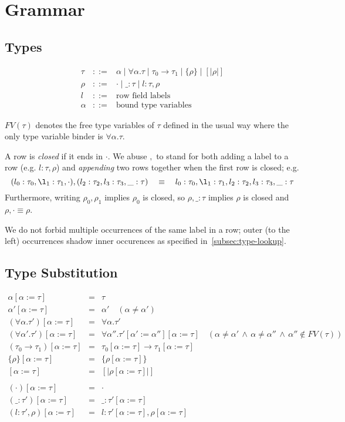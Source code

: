 \documentclass{article}
\newcommand{\define}{::=}
\newcommand{\variant}[1]{[\!|#1|\!]}
\begin{document}
\section{Grammar}

\subsection{Types}
\[\begin{array}{rcl}
\tau & \define & \alpha \mid \forall \alpha. \tau \mid \tau_0 \to \tau_1 \mid \{\rho\} \mid \variant{\rho}
\\
\rho & \define & \cdot \mid \_ : \tau \mid l : \tau, \rho
\\
l & \define & \text{row field labels}
\\
\alpha & \define & \text{bound type variables}
\end{array}
\]

$FV(\tau)$ denotes the free type variables of $\tau$ defined in the
usual way where the only type variable binder is $\forall\alpha.\tau$.

A row is {\it closed} if it ends in $\cdot$. We abuse $,$ to stand
for both adding a label to a row (e.g. $l:\tau,\rho$) and {\it appending}
two rows together when the first row is closed; e.g.
\[
(l_0:\tau_0,\l_1:\tau_1,\cdot),(l_2:\tau_2,l_3:\tau_3,\_:\tau)
\quad
\equiv
\quad
l_0:\tau_0,\l_1:\tau_1,l_2:\tau_2,l_3:\tau_3,\_:\tau
\]
Furthermore, writing $\rho_0,\rho_1$ implies $\rho_0$ is closed,
so $\rho,\_:\tau$ implies $\rho$ is closed and $\rho,\cdot
\equiv \rho$.

We do not forbid multiple occurrences of the same label in a row;
outer (to the left) occurrences shadow inner occurences as specified
in~\ref{subsec:type-lookup}.

\subsection{Type Substitution}
\[
\begin{array}{rcl}
  \alpha[\alpha := \tau] & = & \tau \\
  \alpha'[\alpha := \tau] & = & \alpha' \quad(\alpha \neq \alpha') \\
  (\forall \alpha. \tau')[\alpha := \tau] & = & \forall\alpha.\tau'\\
  (\forall \alpha'. \tau')[\alpha := \tau] & = & \forall \alpha'' . \tau'[\alpha' := \alpha''][\alpha := \tau] \quad (\alpha \neq \alpha' \,\wedge\, \alpha\neq\alpha'' \,\wedge\, \alpha'' \not\in FV(\tau))\\
  (\tau_0 \to \tau_1)[\alpha := \tau] & = & \tau_0[\alpha:=\tau]\to\tau_1[\alpha:=\tau]\\
  \{\rho\}[\alpha := \tau] & = & \{\rho[\alpha:=\tau]\}\\
  \variant{\rho}[\alpha := \tau] & = & \variant{\rho[\alpha:=\tau]} \\
  \\
  (\cdot)[\alpha := \tau] & = & \cdot \\
  (\_ : \tau')[\alpha := \tau] & = & \_ : \tau'[\alpha := \tau] \\
  (l:\tau', \rho)[\alpha := \tau] & = & l:\tau'[\alpha:=\tau],\rho[\alpha:=\tau]
\end{array}
\]
\end{document}
